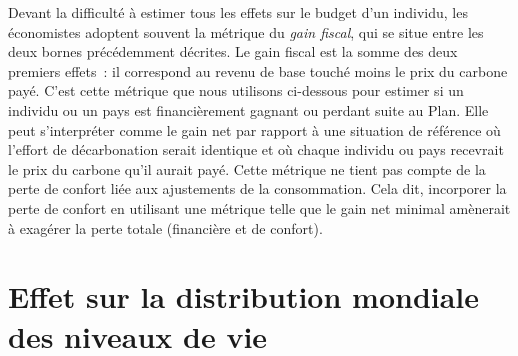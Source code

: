 \documentclass[a5paper,french,openany]{memoir}
\begin{document}
Devant la difficulté à estimer tous les effets sur le budget d'un individu, les économistes adoptent souvent la métrique du \textit{gain fiscal}, qui se situe entre les deux bornes précédemment décrites. Le gain fiscal est la somme des deux premiers effets~: il correspond au revenu de base touché moins le prix du carbone payé. C'est cette métrique que nous utilisons ci-dessous pour estimer si un individu ou un pays est financièrement gagnant ou perdant suite au Plan. Elle peut s'interpréter comme le gain net par rapport à une situation de référence où l'effort de décarbonation serait identique et où chaque individu ou pays recevrait le prix du carbone qu'il aurait payé. Cette métrique ne tient pas compte de la perte de confort liée aux ajustements de la consommation. Cela dit, incorporer la perte de confort en utilisant une métrique %
telle que le gain net minimal amènerait à exagérer la perte totale (financière et de confort).

\section{Effet sur la distribution mondiale des niveaux de vie}\label{app:revenus}
\end{document}
